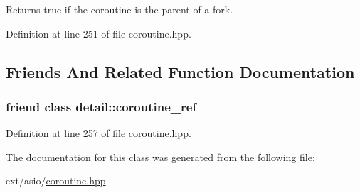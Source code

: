 Returns true if the coroutine is the parent of a fork. 



Definition at line 251 of file coroutine.\+hpp.



\subsection{Friends And Related Function Documentation}
\hypertarget{classasio_1_1coroutine_a481da3cf2fa1764180915143c632eb2e}{}
\subsubsection[{detail\+::coroutine\+\_\+ref}]{\setlength{\rightskip}{0pt plus 5cm}friend class {\bf detail\+::coroutine\+\_\+ref}\hspace{0.3cm}{\ttfamily [friend]}}\label{classasio_1_1coroutine_a481da3cf2fa1764180915143c632eb2e}


Definition at line 257 of file coroutine.\+hpp.



The documentation for this class was generated from the following file\+:\begin{DoxyCompactItemize}
\item 
ext/asio/\hyperlink{coroutine_8hpp}{coroutine.\+hpp}\end{DoxyCompactItemize}
